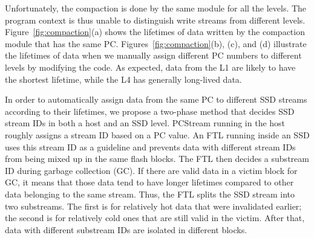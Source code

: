 Unfortunately, the compaction is done by the same module for all the levels.
The program context is thus unable to distinguish write streams from different
levels. Figure~\ref{fig:compaction}(a) shows the lifetimes of data written by
the compaction module that has the same PC.  Figures~\ref{fig:compaction}(b),
(c), and (d) illustrate the lifetimes of data when we manually assign different
PC numbers to different levels by modifying the code.  As expected, data from
the L1 are likely to have the shortest lifetime, while the L4 has generally
long-lived data.

In order to automatically assign data from the same PC to different SSD streams
according to their lifetimes, we propose a two-phase method that decides SSD
stream IDs in both a host and an SSD level.  {\sf PCStream} running in the host
roughly assigns a stream ID based on a PC value.  An FTL running inside an SSD
uses this stream ID as a guideline and prevents data with different stream IDs
from being mixed up in the same flash blocks. The FTL then decides a substream
ID during garbage collection (GC). If there are valid data in a victim block
for GC, it means that those data tend to have longer lifetimes compared to
other data belonging to the same stream. Thus, the FTL splits the SSD stream
into two substreams.  The first is for relatively hot data that were
invalidated earlier; the second is for relatively cold ones that are still
valid in the victim.  After that, data with different substream IDs are
isolated in different blocks. 

